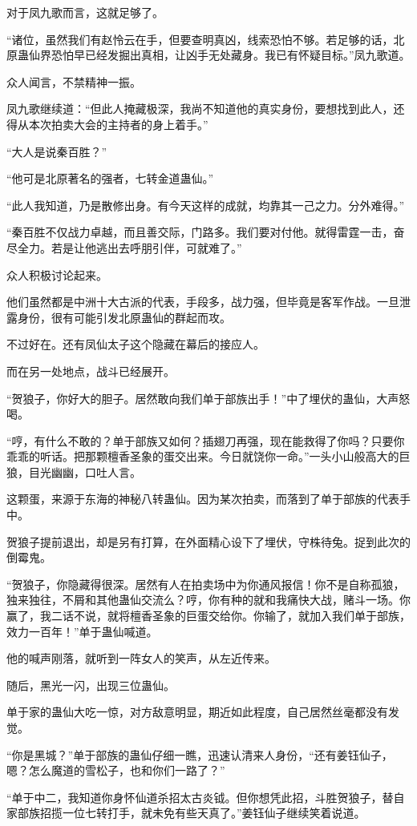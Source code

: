 \begin{this_body}
对于凤九歌而言，这就足够了。

“诸位，虽然我们有赵怜云在手，但要查明真凶，线索恐怕不够。若足够的话，北原蛊仙界恐怕早已经发掘出真相，让凶手无处藏身。我已有怀疑目标。”凤九歌道。

众人闻言，不禁精神一振。

凤九歌继续道：“但此人掩藏极深，我尚不知道他的真实身份，要想找到此人，还得从本次拍卖大会的主持者的身上着手。”

“大人是说秦百胜？”

“他可是北原著名的强者，七转金道蛊仙。”

“此人我知道，乃是散修出身。有今天这样的成就，均靠其一己之力。分外难得。”

“秦百胜不仅战力卓越，而且善交际，门路多。我们要对付他。就得雷霆一击，奋尽全力。若是让他逃出去呼朋引伴，可就难了。”

众人积极讨论起来。

他们虽然都是中洲十大古派的代表，手段多，战力强，但毕竟是客军作战。一旦泄露身份，很有可能引发北原蛊仙的群起而攻。

不过好在。还有凤仙太子这个隐藏在幕后的接应人。

而在另一处地点，战斗已经展开。

“贺狼子，你好大的胆子。居然敢向我们单于部族出手！”中了埋伏的蛊仙，大声怒喝。

“哼，有什么不敢的？单于部族又如何？插翅刀再强，现在能救得了你吗？只要你乖乖的听话。把那颗檀香圣象的蛋交出来。今日就饶你一命。”一头小山般高大的巨狼，目光幽幽，口吐人言。

这颗蛋，来源于东海的神秘八转蛊仙。因为某次拍卖，而落到了单于部族的代表手中。

贺狼子提前退出，却是另有打算，在外面精心设下了埋伏，守株待兔。捉到此次的倒霉鬼。

“贺狼子，你隐藏得很深。居然有人在拍卖场中为你通风报信！你不是自称孤狼，独来独往，不屑和其他蛊仙交流么？哼，你有种的就和我痛快大战，赌斗一场。你赢了，我二话不说，就将檀香圣象的巨蛋交给你。你输了，就加入我们单于部族，效力一百年！”单于蛊仙喊道。

他的喊声刚落，就听到一阵女人的笑声，从左近传来。

随后，黑光一闪，出现三位蛊仙。

单于家的蛊仙大吃一惊，对方敌意明显，期近如此程度，自己居然丝毫都没有发觉。

“你是黑城？”单于部族的蛊仙仔细一瞧，迅速认清来人身份，“还有姜钰仙子，嗯？怎么魔道的雪松子，也和你们一路了？”

“单于中二，我知道你身怀仙道杀招太古炎钺。但你想凭此招，斗胜贺狼子，替自家部族招揽一位七转打手，就未免有些天真了。”姜钰仙子继续笑着说道。


\end{this_body}
